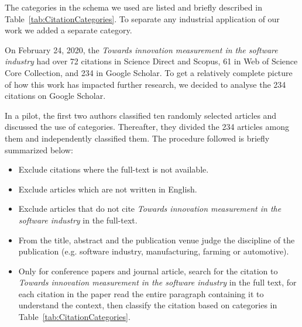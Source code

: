 \documentclass[sigconf,review]{acmart}
\newcommand{\theArticle}{\textit{Towards innovation measurement in the software industry}}
\begin{document}
The categories in the schema we used are listed and briefly described in Table~\ref{tab:CitationCategories}. To separate any industrial application of our work we added a separate category. 

On February 24, 2020, the \theArticle{} had over 72 citations in Science Direct and Scopus, 61 in Web of Science Core Collection, and 234 in Google Scholar. To get a relatively complete picture of how this work has impacted further research, we decided to analyse the 234 citations on Google Scholar. 

In a pilot, the first two authors classified ten randomly selected articles and discussed the use of categories. Thereafter, they divided the 234 articles among them and  independently classified them. The procedure followed is briefly summarized below: 
\begin{itemize}
\item Exclude citations where the full-text is not available. 
\item Exclude articles which are not written in English.
\item Exclude articles  that do not cite \theArticle{} in the full-text.
\item From the title, abstract and the publication venue judge the discipline of the publication (e.g. software industry, manufacturing, farming or automotive).
\item Only for conference papers and journal article, search for the citation to \theArticle{} in the full text, for each citation in the paper  read the entire paragraph containing it to understand the context, then classify the citation based on categories in Table~\ref{tab:CitationCategories}.
\end{itemize}
 
\end{document}
